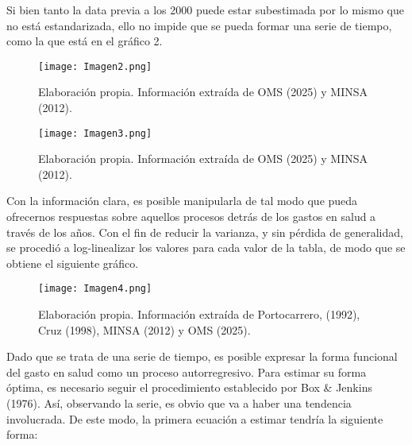 \documentclass[12pt]{article}
\begin{document}
Si bien tanto la data previa a los 2000 puede estar subestimada por lo mismo que no está estandarizada, ello no impide que se pueda formar una serie de tiempo, como la que está en el gráfico 2. 

\bigskip


\begin{figure}[H]
\par\vspace{0.8em}
\texttt{[image: Imagen2.png]}

{\footnotesize Elaboración propia. Información extraída de OMS (2025) y MINSA (2012).}
\end{figure}



\begin{figure}[H]
\par\vspace{0.8em}
\texttt{[image: Imagen3.png]}

{\footnotesize Elaboración propia. Información extraída de OMS (2025) y MINSA (2012).}
\end{figure}

Con la información clara, es posible manipularla de tal modo que pueda ofrecernos respuestas sobre aquellos procesos detrás de los gastos en salud a través de los años. Con el fin de reducir la varianza, y sin pérdida de generalidad, se procedió a log-linealizar los valores para cada valor de la tabla, de modo que se obtiene el siguiente gráfico. 

\bigskip
\bigskip
\bigskip

\begin{figure}[H]
\par\vspace{0.8em}
\texttt{[image: Imagen4.png]}

{\footnotesize Elaboración propia. Información extraída de Portocarrero, (1992), Cruz (1998), MINSA (2012) y OMS (2025).}
\end{figure}

Dado que se trata de una serie de tiempo, es posible expresar la forma funcional del gasto en salud como un proceso autorregresivo. Para estimar su forma óptima, es necesario seguir el procedimiento establecido por Box \& Jenkins (1976). Así, observando la serie, es obvio que va a haber una tendencia involucrada. De este modo, la primera ecuación a estimar tendría la siguiente forma: 
\end{document}
